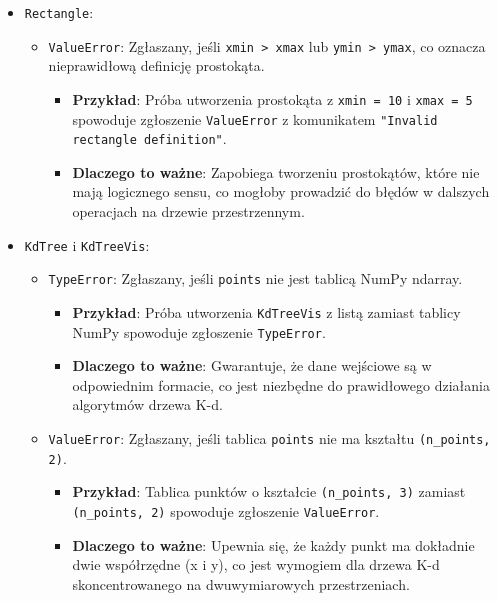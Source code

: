 \documentclass[12pt]{article}
\begin{document}
\begin{itemize}
    \item \texttt{Rectangle}:
    \begin{itemize}
        \item \texttt{ValueError}: Zgłaszany, jeśli \texttt{xmin > xmax} lub \texttt{ymin > ymax}, co oznacza nieprawidłową definicję prostokąta.
        \begin{itemize}
            \item \textbf{Przykład}: Próba utworzenia prostokąta z \texttt{xmin = 10} i \texttt{xmax = 5} spowoduje zgłoszenie \texttt{ValueError} z komunikatem \texttt{"Invalid rectangle definition"}.
            \item \textbf{Dlaczego to ważne}: Zapobiega tworzeniu prostokątów, które nie mają logicznego sensu, co mogłoby prowadzić do błędów w dalszych operacjach na drzewie przestrzennym.
        \end{itemize}
    \end{itemize}
    
    \item \texttt{KdTree} i \texttt{KdTreeVis}:
    \begin{itemize}
        \item \texttt{TypeError}: Zgłaszany, jeśli \texttt{points} nie jest tablicą NumPy ndarray.
        \begin{itemize}
            \item \textbf{Przykład}: Próba utworzenia \texttt{KdTreeVis} z listą zamiast tablicy NumPy spowoduje zgłoszenie \texttt{TypeError}.
            \item \textbf{Dlaczego to ważne}: Gwarantuje, że dane wejściowe są w odpowiednim formacie, co jest niezbędne do prawidłowego działania algorytmów drzewa K-d.
        \end{itemize}
        
        \item \texttt{ValueError}: Zgłaszany, jeśli tablica \texttt{points} nie ma kształtu \texttt{(n\_points, 2)}.
        \begin{itemize}
            \item \textbf{Przykład}: Tablica punktów o kształcie \texttt{(n\_points, 3)} zamiast \texttt{(n\_points, 2)} spowoduje zgłoszenie \texttt{ValueError}.
            \item \textbf{Dlaczego to ważne}: Upewnia się, że każdy punkt ma dokładnie dwie współrzędne (x i y), co jest wymogiem dla drzewa K-d skoncentrowanego na dwuwymiarowych przestrzeniach.
        \end{itemize}
    \end{itemize}
    

\end{itemize}
\end{document}
